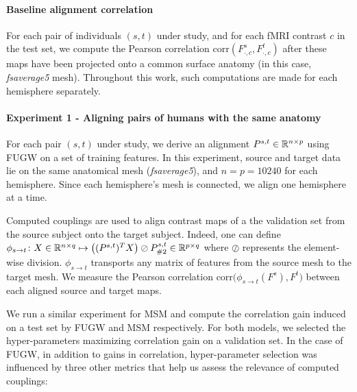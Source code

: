 \paragraph{Baseline alignment correlation}
For each pair of individuals $(s, t)$ under study, and for each fMRI contrast $c$ in the test set,
we compute the Pearson correlation $\text{corr}(F^s_{\cdot, c}, F^t_{\cdot, c})$
after these maps have been projected onto a common surface anatomy (in this case, \emph{fsaverage5}
mesh). Throughout this work, such computations are made for each hemisphere separately.

\paragraph{Experiment 1 - Aligning pairs of humans with the same anatomy}
%
For each pair $(s, t)$ under study, we derive an alignment $P^{s,t} \in \mathbb R^{n \times p}$
using FUGW on a set of training features. In this experiment, source and target data
lie on the same anatomical mesh (\emph{fsaverage5}), and $n = p = 10240$ for each hemisphere.
Since each hemisphere's mesh is connected, we align one hemisphere at a time.

Computed couplings are used to align contrast maps of a the validation set from
the source subject onto the target subject. Indeed, one can define
$\phi_{s \rightarrow t} \colon X \in \mathbb R^{n \times q}
\mapsto \big((P^{s,t})^T X \big) \oslash P^{s,t}_{\#2} \in \mathbb R^{p \times q}$
where $\oslash$ represents the element-wise division. $\phi_{s \rightarrow t}$
transports any matrix of features from the source mesh to the target mesh.
We measure the Pearson correlation $\text{corr}\big( \phi_{s \rightarrow t}(F^s), F^t \big)$
between each aligned source and target maps.

We run a similar experiment for MSM and compute the correlation gain induced on a
test set by FUGW and MSM respectively.
For both models, we selected the hyper-parameters maximizing correlation gain on a validation set.
In the case of FUGW, in addition to gains in correlation, hyper-parameter selection
was influenced by three other metrics that help us assess the relevance of computed couplings:

